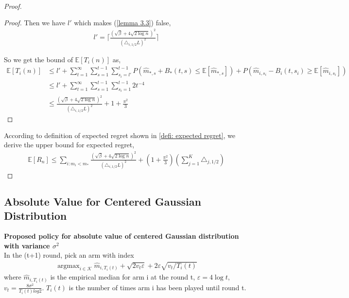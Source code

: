 \documentclass{article}
\DeclareMathOperator*{\argmax}{argmax}
\theoremstyle{plain}
\begin{document}
\begin{proof}
\begin{proof}
    Then we have $l'$ which makes (\ref{lemma 3.3}) false,
   \begin{align}
       l' = \lceil \frac{(\sqrt{\beta} + 4\sqrt{2\log n})^2}{ (\triangle_{i, 1/2} L)^2}  \rceil %
   \end{align} 
   
    So we get the bound of $\mathbb{E}[T_i(n)]$ as,
    \begin{align}
        \mathbb{E}[T_i(n)] &\leq l' + \sum_{t = 1}^\infty \sum_{s = 1}^{t-1} \sum_{s_i = l'}^{t-1} P(\hat{m}_{*, s} + B_*(t, s) \leq  \mathbb{E}[\hat{m}_{*, s}]) + P(\hat{m}_{i, s_i} - B_i(t, s_i) \geq \mathbb{E}[\hat{m}_{i, s_i}])\\
        & \leq l' + \sum_{t = 1}^\infty \sum_{s = 1}^{t-1} \sum_{s_i = 1}^{t-1} 2 t^{-4}\\
        & \leq \frac{(\sqrt{\beta} + 4\sqrt{2\log n})^2}{ (\triangle_{i, 1/2} L)^2}  + 1 + \frac{\pi^2}{3}
    \end{align}
   
\end{proof}

According to definition of expected regret shown in \ref{defi: expected regret}, we derive the upper bound for expected regret,
\begin{align}
    \mathbb{E}[R_n] \leq 
          \sum_{i: m_i < m_\ast}\frac{(\sqrt{\beta} + 4\sqrt{2\log n})^2}{ (\triangle_{i, 1/2} L)^2}  + (1 + \frac{\pi^2}{3}) (\sum_{j=1}^K \triangle_{j, 1/2}) 
\end{align}
\end{proof}

\subsection{Absolute Value for Centered Gaussian Distribution}

\textbf{Proposed policy for absolute value of centered Gaussian distribution with variance $\sigma^2$}\\
In the (t+1) round, pick an arm with index 
\begin{align}
    \label{policy normal}
   \argmax_{i \in \mathcal{K}} \hat{m}_{i, T_i(t)} + \sqrt{2v_t \varepsilon} + 2 \varepsilon \sqrt{v_t/T_i(t)}
\end{align}
where $\hat{m}_{i, T_i(t)}$ is the empirical median for arm i at the round t, $\varepsilon = 4 \log t$, $v_t = \frac{8 \sigma^2}{T_i(t) log2}$. $T_i(t)$ is the number of times arm i has been played until round t.  
\end{document}
